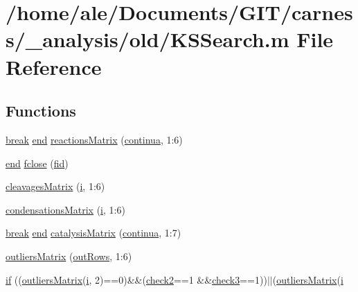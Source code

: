 \hypertarget{a00024}{\section{/home/ale/\-Documents/\-G\-I\-T/carness/\-\_\-analysis/old/\-K\-S\-Search.m File Reference}
\label{a00024}
}
\subsection*{Functions}
\begin{DoxyCompactItemize}
\item 
\hyperlink{a00023_a91cf6fbebedd86150a36e5ac3d5d3bfc}{break} \hyperlink{a00019_afb358f48b1646c750fb9da6c6585be2b}{end} \hyperlink{a00024_af998036b749d9fa6dd2365f9937279b6}{reactions\-Matrix} (\hyperlink{a00024_a9c951ebd5bc3f1adce943bee1255f4d6}{continua}, 1\-:6)
\item 
\hyperlink{a00019_afb358f48b1646c750fb9da6c6585be2b}{end} \hyperlink{a00024_a5f84f51058cdb4f43c29d2c875659f42}{fclose} (\hyperlink{a00025_ae9011d40c6f13e68e6f07156e0da7c5d}{fid})
\item 
\hyperlink{a00024_a90d1d83fdcae4fb1cba5129d5820d33c}{cleavages\-Matrix} (\hyperlink{a00065_ad3efca1ea6e3333daf30719ee0501862}{i}, 1\-:6)
\item 
\hyperlink{a00024_a84a949cdae2c03193c84caf27f855b30}{condensations\-Matrix} (\hyperlink{a00065_ad3efca1ea6e3333daf30719ee0501862}{i}, 1\-:6)
\item 
\hyperlink{a00023_a91cf6fbebedd86150a36e5ac3d5d3bfc}{break} \hyperlink{a00019_afb358f48b1646c750fb9da6c6585be2b}{end} \hyperlink{a00024_a244eec8903103b5bbddef461276286ce}{catalysis\-Matrix} (\hyperlink{a00024_a9c951ebd5bc3f1adce943bee1255f4d6}{continua}, 1\-:7)
\item 
\hyperlink{a00024_aa5604b86cead7c2e2115f5e809f94465}{outliers\-Matrix} (\hyperlink{a00024_a60cfb1ca20cbbc81b85a8f56658b7c99}{out\-Rows}, 1\-:6)
\item 
\hyperlink{a00024_a2d244f3b52c3ed088d60a879743dde0e}{if} ((\hyperlink{a00024_a9733b61dd859b1133aa3aa849cf70cbc}{outliers\-Matrix}(\hyperlink{a00065_ad3efca1ea6e3333daf30719ee0501862}{i}, 2)==0)\&\&(\hyperlink{a00024_a98a8838a85ed24032563a44271b1525a}{check2}==1 \&\&\hyperlink{a00024_adfd17509248a56986475a25ee50fe488}{check3}==1))$|$$|$(\hyperlink{a00024_a9733b61dd859b1133aa3aa849cf70cbc}{outliers\-Matrix}(\hyperlink{a00065_ad3efca1ea6e3333daf30719ee0501862}{i}
$$
\end{DoxyCompactItemize}
